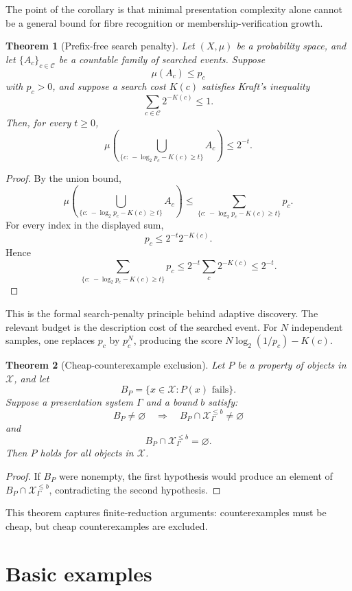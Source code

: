 \documentclass[11pt]{article}
\newtheorem{theorem}{Theorem}[section]
\begin{document}
The point of the corollary is that minimal presentation complexity alone cannot be a general bound for fibre recognition or membership-verification growth.

\begin{theorem}[Prefix-free search penalty]
Let \((X,\mu)\) be a probability space, and let \(\{A_c\}_{c\in\mathcal C}\) be a countable family of searched events. Suppose
\[
\mu(A_c)\leq p_c
\]
with \(p_c>0\), and suppose a search cost \(K(c)\) satisfies Kraft's inequality
\[
\sum_{c\in\mathcal C}2^{-K(c)}\leq 1.
\]
Then, for every \(t\geq 0\),
\[
\mu\left(
\bigcup_{\{c:\,-\log_2 p_c-K(c)\geq t\}} A_c
\right)
\leq 2^{-t}.
\]
\end{theorem}

\begin{proof}
By the union bound,
\[
\mu\left(
\bigcup_{\{c:\,-\log_2 p_c-K(c)\geq t\}} A_c
\right)
\leq
\sum_{\{c:\,-\log_2 p_c-K(c)\geq t\}} p_c.
\]
For every index in the displayed sum,
\[
p_c\leq 2^{-t}2^{-K(c)}.
\]
Hence
\[
\sum_{\{c:\,-\log_2 p_c-K(c)\geq t\}} p_c
\leq
2^{-t}\sum_c2^{-K(c)}
\leq 2^{-t}.
\]
\end{proof}

This is the formal search-penalty principle behind adaptive discovery. The relevant budget is the description cost of the searched event. For \(N\) independent samples, one replaces \(p_c\) by \(p_c^N\), producing the score \(N\log_2(1/p_c)-K(c)\).

\begin{theorem}[Cheap-counterexample exclusion]
Let \(P\) be a property of objects in \(\mathcal X\), and let
\[
B_P=\{x\in\mathcal X:P(x)\text{ fails}\}.
\]
Suppose a presentation system \(\Gamma\) and a bound \(b\) satisfy:
\[
B_P\neq\varnothing
\quad\Longrightarrow\quad
B_P\cap\mathcal X_\Gamma^{\leq b}\neq\varnothing
\]
and
\[
B_P\cap\mathcal X_\Gamma^{\leq b}=\varnothing.
\]
Then \(P\) holds for all objects in \(\mathcal X\).
\end{theorem}

\begin{proof}
If \(B_P\) were nonempty, the first hypothesis would produce an element of \(B_P\cap\mathcal X_\Gamma^{\leq b}\), contradicting the second hypothesis.
\end{proof}

This theorem captures finite-reduction arguments: counterexamples must be cheap, but cheap counterexamples are excluded.


\section{Basic examples}
\end{document}
